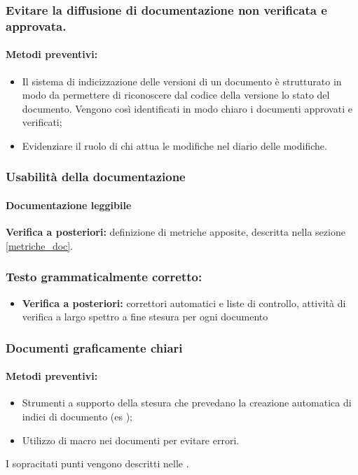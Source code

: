 \documentclass[12pt,a4paper]{article}
\begin{document}
\subsubsection{Evitare la diffusione di documentazione non verificata e approvata.}
\paragraph{Metodi preventivi:}
\begin{itemize}
	\item Il sistema di indicizzazione delle versioni di un documento è strutturato in modo da permettere di riconoscere dal codice della versione lo stato del documento. Vengono così identificati in modo chiaro i documenti approvati e verificati;
	\item Evidenziare il ruolo di chi attua le modifiche nel diario delle modifiche.
\end{itemize}


\subsubsection{Usabilità della documentazione}
\paragraph{Documentazione leggibile}
\textbf{Verifica a posteriori:}  definizione di metriche apposite, descritta nella sezione \ref{metriche_doc}.

\subsubsection{Testo grammaticalmente corretto:}
\begin{itemize}
	\item \textbf{Verifica a posteriori:} correttori automatici e liste di controllo, attività di verifica a largo spettro a fine stesura per ogni documento
\end{itemize}

\subsubsection{Documenti graficamente chiari}
\paragraph{Metodi preventivi:}
\begin{itemize}
	\item Strumenti a supporto della stesura che prevedano la creazione automatica di indici di documento (es \latex);
	\item Utilizzo di macro nei documenti per evitare errori.
\end{itemize}
I sopracitati punti vengono descritti nelle \NdP{}.
\end{document}
